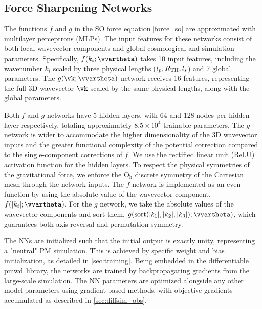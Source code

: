 \documentclass[modern, trackchanges, dvipsnames]{aastex631}
\newcommand{\pmwd}{{\usefont{T1}{nova}{m}{sl}pmwd}}
\begin{document}
\vspace{1em}
\subsection{Force Sharpening Networks}
\label{sec:fsnet}

The functions $f$ and $g$ in the SO force equation \eqref{force_so} are
approximated with multilayer perceptrons (MLPs).
The input features for these networks consist of both local wavevector
components and global cosmological and simulation parameters.
Specifically, $f(k_i; \vvartheta)$ takes 10 input features, including the
wavenumber $k_i$ scaled by three physical lengths ($l_p, R_{\rm TH}, l_s$) and
7 global parameters.
The $g(\vk; \vvartheta)$ network receives 16 features, representing the full
3D wavevector $\vk$ scaled by the same physical lengths, along with the global
parameters.

Both $f$ and $g$ networks have 5 hidden layers, with 64 and 128 nodes per hidden
layer respectively, totaling approximately $8.5 \times 10^4$ trainable
parameters.
The $g$ network is wider to accommodate the higher dimensionality of the 3D
wavevector inputs and the greater functional complexity of the potential
correction compared to the single-component corrections of $f$.
We use the rectified linear unit (ReLU) activation function for the hidden
layers.
To respect the physical symmetries of the gravitational force, we enforce
the $\mathrm{O_h}$ discrete symmetry of the Cartesian mesh through the network
inputs.
The $f$ network is implemented as an even function by using the absolute value
of the wavevector component, $f(|k_i|; \vvartheta)$.
For the $g$ network, we take the absolute values of the wavevector components
and sort them, $g(\mathrm{sort}(|k_1|, |k_2|, |k_3|); \vvartheta)$, which
guarantees both axis-reversal and permutation symmetry.

The NNs are initialized such that the initial output is exactly unity,
representing a "neutral" PM simulation.
This is achieved by specific weight and bias initialization, as detailed
in \autoref{sec:training}.
Being embedded in the differentiable \pmwd\ library, the networks are trained
by backpropagating gradients from the large-scale simulation.
The NN parameters are optimized alongside any other model parameters using
gradient-based methods, with objective gradients accumulated as described in
\autoref{sec:diffsim_obs}.



\vspace{1em}
\end{document}
